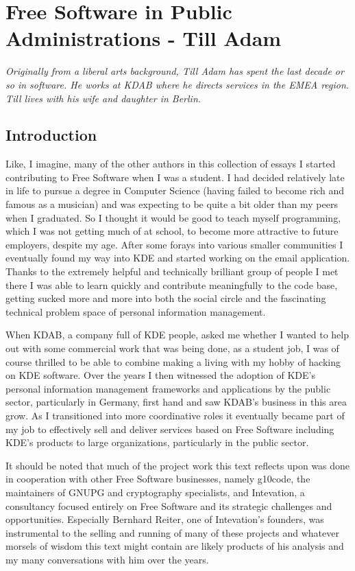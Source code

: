 \chapter{Free Software in Public Administrations - Till Adam}

\textit{Originally from a liberal arts background, Till Adam has spent the last
decade or so in software. He works at KDAB where he directs services in the EMEA
region. Till lives with his wife and daughter in Berlin.}


\section*{Introduction}

Like, I imagine, many of the other authors in this collection of essays I
started contributing to Free Software when I was a student. I had decided
relatively late in life to pursue a degree in Computer Science (having failed
to become rich and famous as a musician) and was expecting to be quite
a bit older than my peers when I graduated. So I thought it would be good
to teach myself programming, which I was not getting much of at
school, to become more attractive to future employers, despite my age.
After some forays into various smaller communities I eventually found my way
into KDE and started working on the email application. Thanks to
the extremely helpful and technically brilliant group of people I met there I
was able to learn quickly and contribute meaningfully to the code base, getting
sucked more and more into both the social circle and the fascinating technical
problem space of personal information management.

When KDAB, a company full of KDE people, asked me whether I wanted to help out
with some commercial work that was being done, as a student job, I was of
course thrilled to be able to combine making a living with my hobby of hacking
on KDE software. Over the years I then witnessed the adoption of KDE's personal
information management frameworks and applications by the public sector,
particularly in Germany, first hand and saw KDAB's business in this area grow.
As I transitioned into more coordinative roles it eventually became part of my
job to effectively sell and deliver services based on Free Software including KDE's products
to large organizations, particularly in the public sector.

It should be noted that much of the project work this text reflects upon was done in
cooperation with other Free Software businesses, namely g10code, the
maintainers of GNUPG and cryptography specialists, and Intevation, a consultancy focused
entirely on Free Software and its strategic challenges and opportunities. Especially
Bernhard Reiter, one of Intevation's founders, was instrumental to the selling and
running of many of these projects and whatever morsels of wisdom this text might contain
are likely products of his analysis and my many conversations with him over the years.

